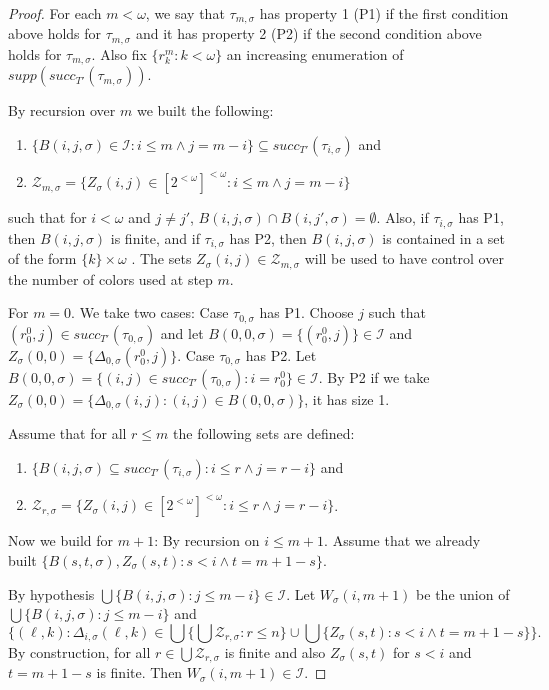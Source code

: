\documentclass{amsart}
\theoremstyle{definition}
\theoremstyle{remark}
\numberwithin{equation}{section}
\newcommand{\id}{\mathcal{I}}
\begin{document}
\begin{proof}
    For each $m<\omega$, we say that $\tau_{m,\sigma}$ has property 1 (P1) if the first condition above holds for $\tau_{m,\sigma}$ and it has property 2 (P2) if the second condition above holds for $\tau_{m,\sigma}$. Also fix $\{r^m_k:k<\omega\}$ an increasing enumeration of $supp(succ_{T'}(\tau_{m,\sigma}))$.

    By recursion over $m$ we built the following:
    \begin{enumerate}
        \item $\{B(i,j,\sigma)\in \id:i\leq m\wedge j=m-i\}\subseteq succ_{T'}(\tau_{i,\sigma})$ and
        \item $\mathcal{Z}_{m,\sigma}=\{Z_\sigma(i,j)\in [2^{<\omega}]^{<\omega} : i\leq m \wedge j=m-i\}$
    \end{enumerate}
    such that for $i<\omega$ and $j\not=j'$, $B(i,j,\sigma)\cap B(i,j',\sigma)=\emptyset$. Also, if $\tau_{i,\sigma}$ has P1, then $B(i,j,\sigma)$ is finite, and if $\tau_{i,\sigma}$ has P2, then $B(i,j,\sigma)$ is contained in a set of the form $\{k\}\times \omega$ . The sets $Z_\sigma(i,j)\in \mathcal{Z}_{m,\sigma}$ will be used to have control over the number of colors used at step $m$.

    For $m=0$. We take two cases:
    Case $\tau_{0,\sigma}$ has P1. Choose $j$ such that $(r_0^0,j)\in succ_{T'}(\tau_{0,\sigma})$ and let $B(0,0,\sigma)=\{(r_0^0,j)\}\in \id$ and $Z_\sigma(0,0)=\{\Delta_{0,\sigma}(r_0^0,j)\}$.
    Case $\tau_{0,\sigma}$ has P2. Let $B(0,0,\sigma)=\{(i,j)\in succ_{T'}(\tau_{0,\sigma}): i=r_0^0\}\in \id$. By P2 if we take $Z_\sigma(0,0)=\{\Delta_{0,\sigma}(i,j):(i,j)\in B(0,0,\sigma)\}$, it has size 1.

    Assume that for all $r\leq m$ the following sets are defined:
    \begin{enumerate}
        \item $\{B(i,j,\sigma)\subseteq succ_{T'}(\tau_{i,\sigma}): i\leq r\wedge j=r-i\}$ and
        \item $\mathcal{Z}_{r,\sigma}=\{Z_\sigma(i,j)\in [2^{<\omega}]^{<\omega} : i\leq r\wedge j=r-i\}$.
    \end{enumerate}
    Now we build for $m+1$: By recursion on $i\leq m+1$.
    Assume that we already built $\{B(s,t,\sigma),Z_\sigma(s,t): s<i \wedge t=m+1-s\}$.

    By hypothesis $\bigcup\{B(i,j,\sigma):j\leq m-i\}\in\id$. Let $W_\sigma(i,m+1)$ be the union of  $\bigcup\{B(i,j,\sigma):j\leq m-i\}$ and
    \begin{displaymath}
             \{(\ell,k): \Delta_{i,\sigma}(\ell,k)\in \bigcup\{\bigcup \mathcal{Z}_{r,\sigma}:r\leq n\}\cup \bigcup\{Z_\sigma(s,t):s<i\wedge t=m+1-s\} \}.
    \end{displaymath}
    By construction, for all $r\in\bigcup \mathcal{Z}_{r,\sigma}$ is finite and also $Z_\sigma(s,t)$ for $s<i$ and $t=m+1-s$ is finite. Then $W_\sigma(i,m+1)\in \id$.
    

\end{proof}
\end{document}
